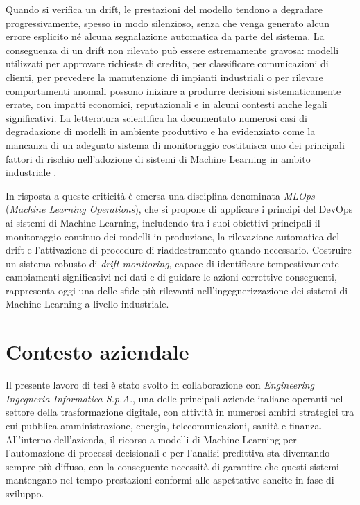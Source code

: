 Quando si verifica un drift, le prestazioni del modello tendono a degradare
progressivamente, spesso in modo silenzioso, senza che venga generato alcun
errore esplicito né alcuna segnalazione automatica da parte del sistema. La
conseguenza di un drift non rilevato può essere estremamente gravosa: modelli
utilizzati per approvare richieste di credito, per classificare comunicazioni
di clienti, per prevedere la manutenzione di impianti industriali o per
rilevare comportamenti anomali possono iniziare a produrre decisioni
sistematicamente errate, con impatti economici, reputazionali e in alcuni
contesti anche legali significativi. La letteratura scientifica ha documentato
numerosi casi di degradazione di modelli in ambiente produttivo e ha
evidenziato come la mancanza di un adeguato sistema di monitoraggio costituisca
uno dei principali fattori di rischio nell'adozione di sistemi di Machine
Learning in ambito industriale \cite{gama2014survey,lu2019learning}.

In risposta a queste criticità è emersa una disciplina denominata
\textit{MLOps} (\textit{Machine Learning Operations}), che si propone di
applicare i principi del DevOps ai sistemi di Machine Learning, includendo tra
i suoi obiettivi principali il monitoraggio continuo dei modelli in produzione,
la rilevazione automatica del drift e l'attivazione di procedure di
riaddestramento quando necessario. Costruire un sistema robusto di
\textit{drift monitoring}, capace di identificare tempestivamente cambiamenti
significativi nei dati e di guidare le azioni correttive conseguenti,
rappresenta oggi una delle sfide più rilevanti nell'ingegnerizzazione dei
sistemi di Machine Learning a livello industriale.


\section{Contesto aziendale}
\label{sec:contesto-aziendale}

Il presente lavoro di tesi è stato svolto in collaborazione con
\textit{Engineering Ingegneria Informatica S.p.A.}, una delle principali
aziende italiane operanti nel settore della trasformazione digitale, con
attività in numerosi ambiti strategici tra cui pubblica amministrazione,
energia, telecomunicazioni, sanità e finanza. All'interno dell'azienda, il
ricorso a modelli di Machine Learning per l'automazione di processi
decisionali e per l'analisi predittiva sta diventando sempre più diffuso,
con la conseguente necessità di garantire che questi sistemi mantengano nel
tempo prestazioni conformi alle aspettative sancite in fase di sviluppo.

